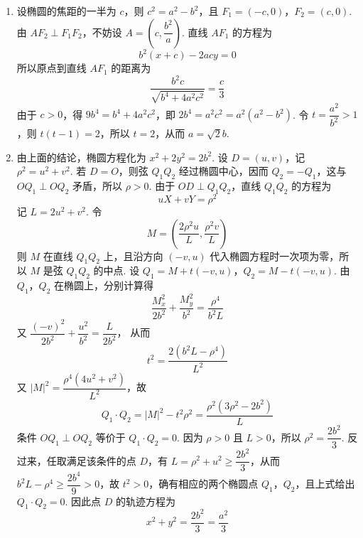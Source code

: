 \begin{solution}
\begin{enumerate}
\item 设椭圆的焦距的一半为 \(c\)，则 \(c^2=a^2-b^2\)，且 \(F_1=(-c,0)\)，\(F_2=(c,0)\). 由 \(AF_2\perp F_1F_2\)，不妨设 \(A=\left(c,\dfrac{b^2}{a}\right)\). 直线 \(AF_1\) 的方程为
\[
b^2(x+c)-2acy=0
\]
所以原点到直线 \(AF_1\) 的距离为
\[
\dfrac{b^2c}{\sqrt{b^4+4a^2c^2}}=\dfrac{c}{3}
\]
由于 \(c>0\)，得 \(9b^4=b^4+4a^2c^2\)，即 \(2b^4=a^2c^2=a^2(a^2-b^2)\). 令 \(t=\dfrac{a^2}{b^2}>1\)，则 \(t(t-1)=2\)，所以 \(t=2\)，从而 \(a=\sqrt{2}b\).
\item 由上面的结论，椭圆方程化为 \(x^2+2y^2=2b^2\). 设 \(D=(u,v)\)，记 \(\rho^2=u^2+v^2\). 若 \(D=O\)，则弦 \(Q_1Q_2\) 经过椭圆中心，因而 \(Q_2=-Q_1\)，这与 \(OQ_1\perp OQ_2\) 矛盾，所以 \(\rho>0\). 由于 \(OD\perp Q_1Q_2\)，直线 \(Q_1Q_2\) 的方程为
\[
uX+vY=\rho^2
\]
记 \(L=2u^2+v^2\). 令
\[
M=\left(\dfrac{2\rho^2u}{L},\dfrac{\rho^2v}{L}\right)
\]
则 \(M\) 在直线 \(Q_1Q_2\) 上，且沿方向 \((-v,u)\) 代入椭圆方程时一次项为零，所以 \(M\) 是弦 \(Q_1Q_2\) 的中点. 设
\(Q_1=M+t(-v,u)\)，\(Q_2=M-t(-v,u)\).
由 \(Q_1\)，\(Q_2\) 在椭圆上，分别计算得
\[
\dfrac{M_x^2}{2b^2}+\dfrac{M_y^2}{b^2}=\dfrac{\rho^4}{b^2L}
\]
又 \(\dfrac{(-v)^2}{2b^2}+\dfrac{u^2}{b^2}=\dfrac{L}{2b^2}\)，
从而
\[
t^2=\dfrac{2(b^2L-\rho^4)}{L^2}
\]
又 \(|M|^2=\dfrac{\rho^4(4u^2+v^2)}{L^2}\)，故
\[
Q_1\cdot Q_2=|M|^2-t^2\rho^2=\dfrac{\rho^2(3\rho^2-2b^2)}{L}
\]
条件 \(OQ_1\perp OQ_2\) 等价于 \(Q_1\cdot Q_2=0\). 因为 \(\rho>0\) 且 \(L>0\)，所以 \(\rho^2=\dfrac{2b^2}{3}\). 反过来，任取满足该条件的点 \(D\)，有 \(L=\rho^2+u^2\geqslant\dfrac{2b^2}{3}\)，从而 \(b^2L-\rho^4\geqslant\dfrac{2b^4}{9}>0\)，故 \(t^2>0\)，确有相应的两个椭圆点 \(Q_1\)，\(Q_2\)，且上式给出 \(Q_1\cdot Q_2=0\). 因此点 \(D\) 的轨迹方程为
\[
x^2+y^2=\dfrac{2b^2}{3}=\dfrac{a^2}{3}
\]
\end{enumerate}
\end{solution}
